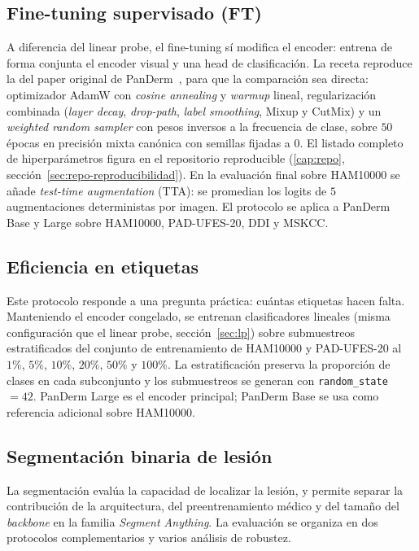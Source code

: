 \subsection{Fine-tuning supervisado (FT)}
\label{sec:ft}

A diferencia del linear probe, el fine-tuning sí modifica el
encoder: entrena de forma conjunta el encoder visual y una head de
clasificación. La receta reproduce la del paper original de
PanDerm~\cite{panderm2025}, para que la comparación sea directa:
optimizador AdamW con \emph{cosine annealing} y \emph{warmup}
lineal, regularización combinada (\emph{layer decay},
\emph{drop-path}, \emph{label smoothing}, Mixup y CutMix) y un
\emph{weighted random sampler} con pesos inversos a la frecuencia de
clase, sobre $50$ épocas en precisión mixta canónica con semillas
fijadas a $0$. El listado completo de hiperparámetros figura en el
repositorio reproducible (\ref{cap:repo},
sección~\ref{sec:repo-reproducibilidad}). En la evaluación final
sobre HAM10000 se añade \emph{test-time augmentation} (TTA): se
promedian los logits de $5$ augmentaciones deterministas por imagen.
El protocolo se aplica a PanDerm Base y Large sobre HAM10000,
PAD-UFES-20, DDI y MSKCC.

\subsection{Eficiencia en etiquetas}
\label{sec:label-eff}

Este protocolo responde a una pregunta práctica: cuántas etiquetas
hacen falta. Manteniendo el encoder congelado, se entrenan
clasificadores lineales (misma configuración que el linear probe,
sección~\ref{sec:lp}) sobre submuestreos estratificados del
conjunto de entrenamiento de HAM10000 y PAD-UFES-20 al $1\%$,
$5\%$, $10\%$, $20\%$, $50\%$ y $100\%$. La
estratificación preserva la proporción de clases en cada subconjunto
y los submuestreos se generan con \texttt{random\_state}~$=42$.
PanDerm Large es el encoder principal; PanDerm Base se usa como
referencia adicional sobre HAM10000.

\subsection{Segmentación binaria de lesión}
\label{sec:segmentacion}

La segmentación evalúa la capacidad de localizar la lesión, y permite
separar la contribución de la arquitectura, del preentrenamiento médico
y del tamaño del \emph{backbone} en la familia \emph{Segment Anything}.
La evaluación se organiza en dos protocolos complementarios y varios
análisis de robustez.

